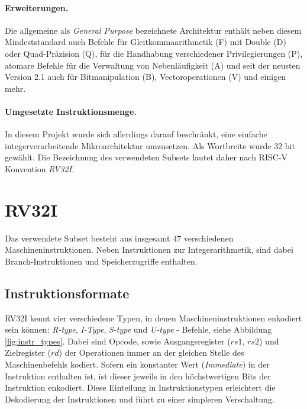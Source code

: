 \paragraph{Erweiterungen.} Die allgemeine als \textit{General Purpose} bezeichnete Architektur enthält neben diesem Mindeststandard auch Befehle für Gleitkommaarithmetik (F) mit Double (D) oder Quad-Präzision (Q), für die Handhabung verschiedener Privilegierungen (P), atomare Befehle für die Verwaltung von Nebenläufigkeit (A) und seit der neusten Version 2.1 auch für Bitmanipulation (B), Vectoroperationen (V) und einigen mehr. \cite[p. 4f.]{RISC}

\paragraph{Umgesetzte Instruktionsmenge.} In diesem Projekt wurde sich allerdings darauf beschränkt, eine einfache integerverarbeitende Mikroarchitektur umzusetzen. Als Wortbreite wurde 32 bit gewählt. Die Bezeichnung des verwendeten Subsets lautet daher nach RISC-V Konvention \textit{RV32I}. \cite[p. 67ff.]{RISC}

\section{RV32I}
Das verwendete Subset besteht aus insgesamt $47$ verschiedenen Maschineninstruktionen. Neben Instruktionen zur Integerarithmetik, sind dabei Branch-Instruktionen und Speicherzugriffe enthalten.

\subsection{Instruktionsformate}
RV32I kennt vier verschiedene Typen, in denen Maschineninstruktionen enkodiert sein können: \textit{R-type}, \textit{I-Type}, \textit{S-type} und \textit{U-type} - Befehle, siehe Abbildung \ref{fig:instr_types}. Dabei sind Opcode, sowie Ausgangsregister ($rs1$, $rs2$) und Zielregister ($rd$) der Operationen immer an der gleichen Stelle des Maschinenbefehls kodiert. Sofern ein konstanter Wert (\emph{Immediate}) in der Instruktion enthalten ist, ist dieser jeweils in den höchstwertigen Bits der Instruktion enkodiert. Diese Einteilung in Instruktionstypen erleichtert die Dekodierung der Instruktionen und führt zu einer simpleren Verschaltung.

